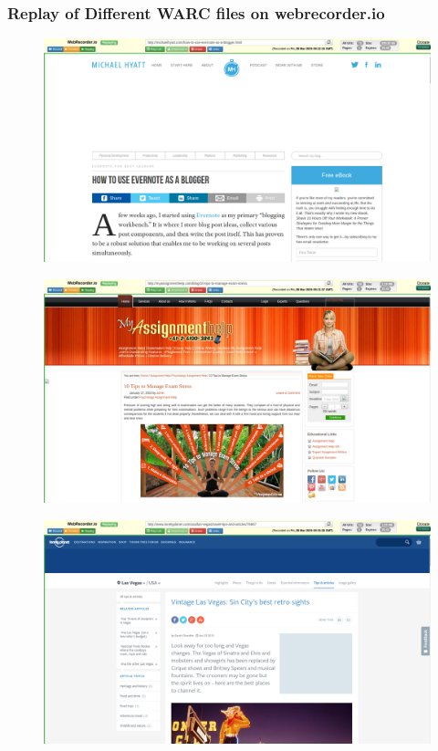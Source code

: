 \subsubsection{Replay of Different WARC files on webrecorder.io}
\begin{figure}[ht]    
    \begin{center}
        \includegraphics[width=\paperwidth]{warc-replay-1.png}
        \caption{}        
    \end{center}
\end{figure}

\begin{figure}[ht]    
    \begin{center}
        \includegraphics[width=\paperwidth]{warc-replay-2.png}
        \caption{}
    \end{center}
\end{figure}

\begin{figure}[ht]    
    \begin{center}
        \includegraphics[width=\paperwidth]{warc-replay-3.png}
        \caption{}
    \end{center}
\end{figure}







